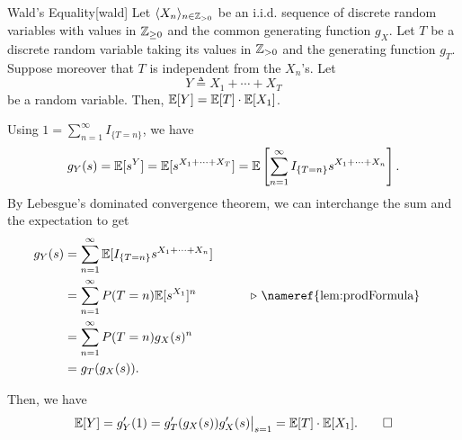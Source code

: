 \documentclass[../probability.tex]{subfiles}
\begin{document}
\begin{Theorem}{Wald's Equality}[wald]
    Let \(\lang X_n \rang_{n \in \ZZ_{>0}}\) be an i.i.d. sequence of discrete random variables with
    values in \(\ZZ_{\ge 0}\) and the common generating function \(g_X\).
    Let \(T\) be a discrete random variable taking its values in \(\ZZ_{> 0}\) and the generating
    function \(g_T\). Suppose moreover that \(T\) is independent from the \(X_n\)'s.
    Let
    \[
        Y \triangleq X_1 + \cdots + X_T
    \]
    be a random variable.
    Then, \(\mathbb{E}[Y] = \mathbb{E}[T] \cdot \mathbb{E}[X_1]\).
\end{Theorem}
    \begin{myproof}[Proof]
    Using \(1 = \sum_{n=1}^\infty I_{\{T = n\}}\), we have
    \[
        g_Y(s) = \mathbb{E}[s^Y] = \mathbb{E}[s^{X_1 + \cdots + X_T}]
        = \mathbb{E} \left[ \sum_{n=1}^\infty I_{\{T=n\}} s^{X_1+\cdots+X_n} \right]\text.
    \]
    By Lebesgue's dominated convergence theorem, we can interchange the sum and the expectation to get
    \begin{alignat*}{2}
        g_Y(s)
        &= \sum_{n=1}^\infty \mbb{E}[I_{\{T=n\}} s^{X_1+\cdots+X_n}] &\qquad \\
        &= \sum_{n=1}^\infty P(T=n) \mbb{E}[s^{X_1}]^n && \comment{\nameref{lem:prodFormula}} \\
        &= \sum_{n=1}^\infty P(T=n) g_X(s)^n \\
        &= g_T(g_X(s))\text.
    \end{alignat*}

    Then, we have
    \[
        \mbb{E}[Y] = g_Y'(1)
        = \restr{g_T'(g_X(s))g_X'(s)}{s=1} = \mbb{E}[T] \cdot \mbb{E}[X_1]\text.\qedhere
    \]
\end{myproof}
\end{document}
